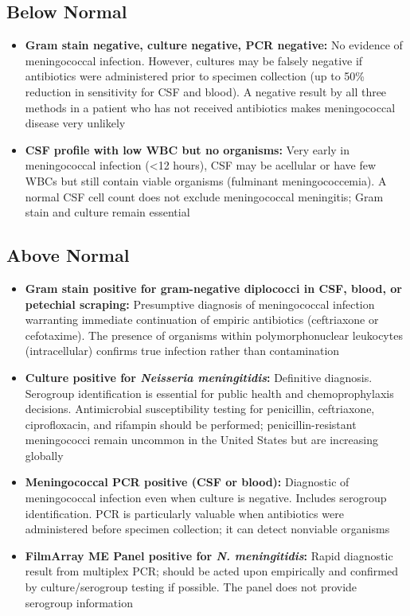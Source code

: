 \subsection*{Below Normal}
\begin{itemize}
  \item \textbf{Gram stain negative, culture negative, PCR negative:} No evidence of meningococcal infection. However, cultures may be falsely negative if antibiotics were administered prior to specimen collection (up to 50\% reduction in sensitivity for CSF and blood). A negative result by all three methods in a patient who has not received antibiotics makes meningococcal disease very unlikely
  \item \textbf{CSF profile with low WBC but no organisms:} Very early in meningococcal infection (<12 hours), CSF may be acellular or have few WBCs but still contain viable organisms (fulminant meningococcemia). A normal CSF cell count does not exclude meningococcal meningitis; Gram stain and culture remain essential
\end{itemize}

\subsection*{Above Normal}
\begin{itemize}
  \item \textbf{Gram stain positive for gram-negative diplococci in CSF, blood, or petechial scraping:} Presumptive diagnosis of meningococcal infection warranting immediate continuation of empiric antibiotics (ceftriaxone or cefotaxime). The presence of organisms within polymorphonuclear leukocytes (intracellular) confirms true infection rather than contamination
  \item \textbf{Culture positive for \textit{Neisseria meningitidis}:} Definitive diagnosis. Serogroup identification is essential for public health and chemoprophylaxis decisions. Antimicrobial susceptibility testing for penicillin, ceftriaxone, ciprofloxacin, and rifampin should be performed; penicillin-resistant meningococci remain uncommon in the United States but are increasing globally
  \item \textbf{Meningococcal PCR positive (CSF or blood):} Diagnostic of meningococcal infection even when culture is negative. Includes serogroup identification. PCR is particularly valuable when antibiotics were administered before specimen collection; it can detect nonviable organisms
  \item \textbf{FilmArray ME Panel positive for \textit{N. meningitidis}:} Rapid diagnostic result from multiplex PCR; should be acted upon empirically and confirmed by culture/serogroup testing if possible. The panel does not provide serogroup information
\end{itemize}

